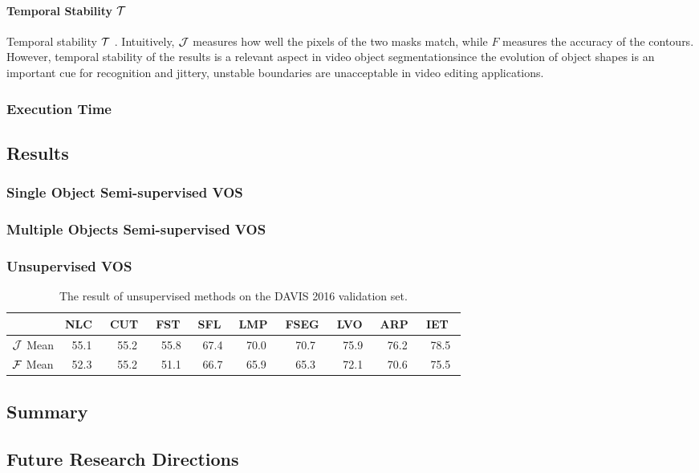 \paragraph{Temporal Stability $\mathcal{T}$}
Temporal stability $\mathcal{T}$ . Intuitively, $\mathcal{J}$ measures how well the pixels of the two masks match, while $F$ measures the
accuracy of the contours. However, temporal stability of the results is a relevant aspect in video object segmentationsince the evolution of object shapes is an important cue for
recognition and jittery, unstable boundaries are unacceptable in video editing applications. 

\subsubsection{Execution Time}

\subsection{Results}


\subsubsection{Single Object Semi-supervised VOS}

\subsubsection{Multiple Objects Semi-supervised VOS}

\subsubsection{Unsupervised VOS}

\begin{table*}[t!h]
	\begin{center}
		\begin{tabular}{|c|c|c|c|c|c|c|c|c|c|}
			\hline
			&NLC~\cite{Faktor2014Video} &CUT~\cite{Keuper2015Motion} &FST~\cite{Papazoglou2013Fast} &SFL~\cite{Cheng2017SegFlow:} &LMP~\cite{Tokmakov2017Learninga} &FSEG~\cite{Jain2017FusionSeg:} &LVO~\cite{Tokmakov2017Learning} & ARP~\cite{Koh2017Primary} 
			&IET~\cite{Li2018Instance} \\
			\hline
			$\mathcal{J}$ Mean &55.1 &55.2	&55.8 &67.4 & 70.0 & 70.7 &75.9 &76.2 &78.5 \\
			\hline
			$\mathcal{F}$ Mean &52.3 &55.2 &51.1 &66.7 &65.9 &65.3 &72.1 &70.6 &75.5 \\
			\hline
		\end{tabular}
	\end{center}
	\caption{The result of unsupervised methods on the DAVIS 2016 validation set.}
	\label{table:davis_unsuperivsed}
\end{table*}

\subsection{Summary}

\subsection{Future Research Directions}